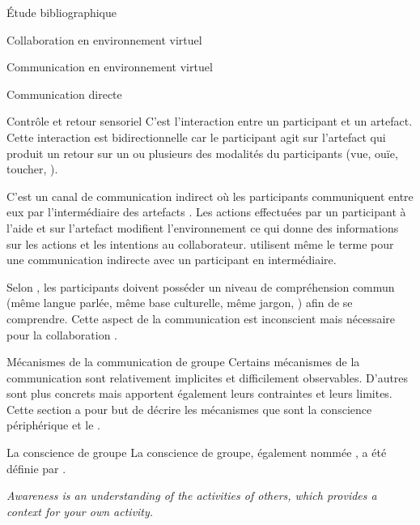 \documentclass[myfrancais,ngerman,english,french]{mythesis}
\begin{document}
\begin{mychapter}{Étude bibliographique}
\begin{mysection}{Collaboration en environnement virtuel}
\begin{mysubsection}{Communication en environnement virtuel}
\begin{mysubsubsection}{Communication directe}
				\end{mysubsubsection}
				\begin{mysubsubsection}{Contrôle et retour sensoriel}
					C'est l'interaction entre un participant et un artefact.
					Cette interaction est bidirectionnelle car le participant agit sur l'artefact qui produit un retour sur un ou plusieurs des modalités du participants (vue, ouïe, toucher, \myetc).
				\end{mysubsubsection}
				\begin{mysubsubsection}{\myFeedthrough}
					C'est un canal de communication indirect où les participants communiquent entre eux par l'intermédiaire des artefacts .
					Les actions effectuées par un participant à l'aide et sur l'artefact modifient l'environnement ce qui donne des informations sur les actions et les intentions au collaborateur.
					 utilisent même le terme \myfeedthrough pour une communication indirecte avec un participant en intermédiaire.
				\end{mysubsubsection}
				\begin{mysubsubsection}{\myGrounding}
					Selon , les participants doivent posséder un niveau de compréhension commun (même langue parlée, même base culturelle, même jargon, \myetc) afin de se comprendre.
					Cette aspect de la communication est inconscient mais nécessaire pour la collaboration .
				\end{mysubsubsection}
			\end{mysubsection}
			\begin{mysubsection}{Mécanismes de la communication de groupe}
				Certains mécanismes de la communication sont relativement implicites et difficilement observables.
				D'autres sont plus concrets mais apportent également leurs contraintes et leurs limites.
				Cette section a pour but de décrire les mécanismes que sont la conscience périphérique et le \mygrounding.
				\begin{mysubsubsection}{La conscience de groupe}
					La conscience de groupe, également nommée \myawareness, a été définie par .
					\begin{myquote}[english]
						\it Awareness is an understanding of the activities of others, which provides a context for your own activity.

\end{myquote}
\end{mysubsubsection}
\end{mysubsection}
\end{mysection}
\end{mychapter}
\end{document}
